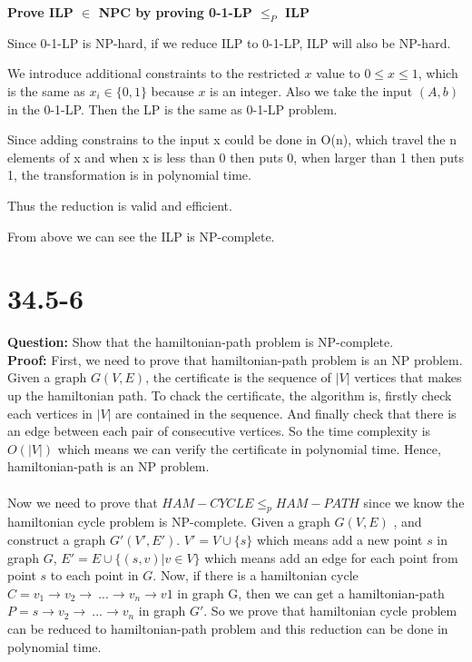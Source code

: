 \documentclass[12pt]{article}
\begin{document}
\textbf{Prove ILP $\in$ NPC by proving 0-1-LP $\leq_{P}$ ILP}

Since 0-1-LP is NP-hard, if we reduce ILP to 0-1-LP, ILP will also be NP-hard. 

We introduce additional constraints to the restricted $x$ value to $0 \leq x \leq 1$, which is the same as $x_i \in \{0,1\}$ because $x$ is an integer. Also we take the input $(A,b)$ in the 0-1-LP. Then the LP is the same as 0-1-LP problem.

Since adding constrains to the input x could be done in O(n), which travel the n elements of x and when x is less than 0 then puts 0, when larger than 1 then puts 1, the transformation is in polynomial time.

Thus the reduction is valid and efficient.

From above we can see the ILP is NP-complete.

\section{34.5-6}
\textbf{Question: }Show that the hamiltonian-path problem is NP-complete.\\
\textbf{Proof: } First, we need to prove that hamiltonian-path problem is an NP problem.
Given a graph \(G(V,E)\), the certificate is the sequence of \(|V|\) vertices that makes up the hamiltonian path. To chack the certificate, the algorithm is, firstly check each vertices in \(|V|\) are contained in the sequence. And finally check that there is an edge between each pair of consecutive vertices. So the time complexity is \(O(|V|)\) which means we can verify the certificate in polynomial time. Hence, hamiltonian-path is an NP problem.
\\
\\
Now we need to prove that \(HAM-CYCLE \leq_p HAM-PATH\) since we know the hamiltonian cycle problem is NP-complete. Given a graph \(G(V,E)\) , and construct a graph \(G'(V',E')\). \(V'= V\cup\{s\}\) which means add a new point \(s\) in graph \(G\), \(E' = E \cup\{(s,v)| v\in V\}\) which means add an edge for each point from point \(s\) to each point in \(G\). 
Now, if there is a hamiltonian cycle \(C=v_1\rightarrow v_2\rightarrow\ ... \rightarrow v_n\rightarrow v1\) in graph G, then we can get a hamiltonian-path \(P= s\rightarrow v_2\rightarrow\ ... \rightarrow v_n\) in graph \(G'\). So we prove that hamiltonian cycle problem can be reduced to hamiltonian-path problem and this reduction can be done in polynomial time.
\end{document}
